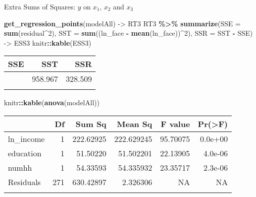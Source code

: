 \documentclass[
  ignorenonframetext,
]{beamer}
\newenvironment{Shaded}{\begin{snugshade}}{\end{snugshade}}
\newcommand{\AttributeTok}[1]{\textcolor[rgb]{0.13,0.29,0.53}{#1}}
\newcommand{\DecValTok}[1]{\textcolor[rgb]{0.00,0.00,0.81}{#1}}
\newcommand{\FunctionTok}[1]{\textcolor[rgb]{0.13,0.29,0.53}{\textbf{#1}}}
\newcommand{\NormalTok}[1]{#1}
\newcommand{\OtherTok}[1]{\textcolor[rgb]{0.56,0.35,0.01}{#1}}
\newcommand{\SpecialCharTok}[1]{\textcolor[rgb]{0.81,0.36,0.00}{\textbf{#1}}}
\begin{document}
\begin{frame}[fragile]{Extra Sums of Squares: \(y\) on \(x_1\), \(x_2\)
and \(x_3\)}
\protect\hypertarget{extra-sums-of-squares-y-on-x_1-x_2-and-x_3-1}{}
\normalsize

\begin{Shaded}
\begin{Highlighting}[]
\FunctionTok{get\_regression\_points}\NormalTok{(modelAll) }\OtherTok{{-}\textgreater{}}\NormalTok{ RT3}
\NormalTok{RT3 }\SpecialCharTok{\%\textgreater{}\%} 
  \FunctionTok{summarize}\NormalTok{(}\AttributeTok{SSE =} \FunctionTok{sum}\NormalTok{(residual}\SpecialCharTok{\^{}}\DecValTok{2}\NormalTok{), }
            \AttributeTok{SST =} \FunctionTok{sum}\NormalTok{((ln\_face }\SpecialCharTok{{-}} \FunctionTok{mean}\NormalTok{(ln\_face))}\SpecialCharTok{\^{}}\DecValTok{2}\NormalTok{),}
            \AttributeTok{SSR =}\NormalTok{ SST }\SpecialCharTok{{-}}\NormalTok{ SSE) }\OtherTok{{-}\textgreater{}}\NormalTok{ ESS3}
\NormalTok{knitr}\SpecialCharTok{::}\FunctionTok{kable}\NormalTok{(ESS3)}
\end{Highlighting}
\end{Shaded}

\begin{longtable}[]{@{}rrr@{}}
\toprule\noalign{}
SSE & SST & SSR \\
\midrule\noalign{}
\endhead
630.458 & 958.967 & 328.509 \\
\bottomrule\noalign{}
\end{longtable}

\begin{Shaded}
\begin{Highlighting}[]
\NormalTok{knitr}\SpecialCharTok{::}\FunctionTok{kable}\NormalTok{(}\FunctionTok{anova}\NormalTok{(modelAll))}
\end{Highlighting}
\end{Shaded}

\begin{longtable}[]{@{}lrrrrr@{}}
\toprule\noalign{}
& Df & Sum Sq & Mean Sq & F value & Pr(\textgreater F) \\
\midrule\noalign{}
\endhead
ln\_income & 1 & 222.62925 & 222.629245 & 95.70075 & 0.0e+00 \\
education & 1 & 51.50220 & 51.502201 & 22.13905 & 4.0e-06 \\
numhh & 1 & 54.33593 & 54.335932 & 23.35717 & 2.3e-06 \\
Residuals & 271 & 630.42897 & 2.326306 & NA & NA \\
\bottomrule\noalign{}
\end{longtable}

\normalsize
\end{frame}
\end{document}
